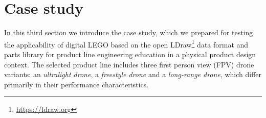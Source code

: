\documentclass[sigconf,review]{acmart}
\begin{document}
\section{Case study}
\label{sec:case-study}

In this third section we introduce the case study, which we prepared for testing the applicability of digital LEGO based on the open LDraw\footnote{\url{https://ldraw.org}} data format and parts library for product line engineering education in a physical product design context.
The selected product line includes three first person view (FPV) drone variants: an \textit{ultralight drone}, a \textit{freestyle drone} and a \textit{long-range drone}, which differ primarily in their performance characteristics.

\begin{figure}[tbp]
    \hfill
    \hfill
    \hfill
    \hfill
    \hfill


\end{figure}
\end{document}
